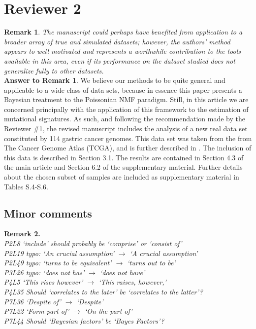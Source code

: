 \documentclass[11pt]{amsart}
\begin{document}
\section*{Reviewer 2}
\textbf{Remark 1}. \emph{
The manuscript could perhaps have benefited from application to a broader array of true and simulated datasets; however, the authors’ method appears to well motivated and represents a worthwhile contribution to the tools available in this area, even if its performance on the dataset studied does not generalize fully to other datasets.}
\\

\textbf{Answer to Remark 1}.  We believe our methods to be quite general and applicable to a wide class of data sets, because in essence this paper presents a Bayesian treatment to the Poissonian NMF paradigm. Still, in this article we are concerned principally with the application of this framework to the estimation of mutational signatures. As such, and following the recommendation made by the Reviewer \#1, the revised manuscript includes the analysis of a new real data set constituted by 114 gastric cancer genomes. This data set was taken from the from The Cancer Genome Atlas (TCGA), and is further described in \cite{gastrico}. The inclusion of this data is described in Section 3.1. The results are contained in Section 4.3 of the main article and Section 6.2 of the supplementary material. Further  details about the chosen subset of samples are included as supplementary material in Tables S.4-S.6.
\\

\subsection*{Minor comments}
\textbf{Remark 2.}\\
\emph{
P2L8 `include' should probably be `comprise' or `consist of'\\
P2L19 typo: `An crucial assumption' $\to$ `A crucial assumption'\\
P2L49 typo: `turns to be equivalent' $\to$ `turns out to be'\\
P3L26 typo: `does not has' $\to$ `does not have'\\
P4L5 `This rises however' $\to$ `This raises, however,'\\
P4L35 Should `correlates to the later' be `correlates to the latter'?\\
P7L36 `Despite of' $\to$ `Despite'\\
P7L22 `Form part of' $\to$ `On the part of'\\
P7L44 Should `Bayesian factors' be `Bayes Factors'?\\
}
\end{document}
